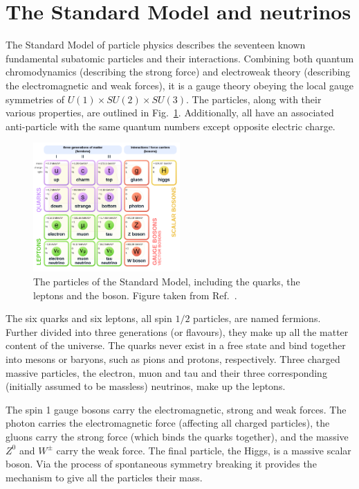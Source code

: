 \section{The Standard Model and neutrinos} %
\label{sec:theory_sm} %

The Standard Model of particle physics describes the seventeen known fundamental subatomic
particles and their interactions. Combining both quantum chromodynamics (describing the strong
force) and electroweak theory (describing the electromagnetic and weak forces), it is a gauge
theory obeying the local gauge symmetries of $U(1) \times SU(2) \times SU(3)$. The particles,
along with their various properties, are outlined in Fig.~\ref{fig:sm}. Additionally, all have an
associated anti-particle with the same quantum numbers except opposite electric charge.

\begin{figure} %
    \includegraphics[origin=c,width=0.5\textwidth]{diagrams/3-theory/sm.png}
    \caption[The particles of the Standard Model]
    {The particles of the Standard Model, including the quarks, the leptons and the boson. Figure
        taken from Ref.~\cite{wiki2020}.}
    \label{fig:sm}
\end{figure}

The six quarks and six leptons, all spin $1/2$ particles, are named fermions. Further divided into
three generations (or flavours), they make up all the matter content of the universe. The quarks
never exist in a free state and bind together into mesons or baryons, such as pions and protons,
respectively.  Three charged massive particles, the electron, muon and tau and their three
corresponding (initially assumed to be massless) neutrinos, make up the leptons.

The spin 1 gauge bosons carry the electromagnetic, strong and weak forces. The photon carries the
electromagnetic force (affecting all charged particles), the gluons carry the strong force (which
binds the quarks together), and the massive $Z^{0}$ and $W^{\pm}$ carry the weak force. The final
particle, the Higgs, is a massive scalar boson. Via the process of spontaneous symmetry breaking
it provides the mechanism to give all the particles their mass.

